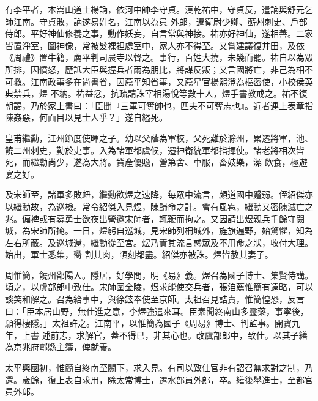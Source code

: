 \begin{pinyinscope}
 有李平者，本嵩山道士楊訥，依河中帥李守貞。漢乾祐中，守貞反，遣訥與舒元乞師江南。守貞敗，訥遂易姓名，江南以為員
 外郎，遷衛尉少卿、蘄州刺史、戶部侍郎。平好神仙修養之事，動作妖妄，自言常與神接。祐亦好神仙，遂相善。二家皆置淨室，圖神像，常被髮裸袒處室中，家人亦不得至。又嘗建議復井田，及依《周禮》置牛籍，薦平判司農寺以督之。事行，百姓大撓，未幾而罷。祐自以為眾所排，因憤怒，歷詆大臣與握兵者兩為朋比，將謀反叛；又言國將亡，非己為相不可救。江南政事多在尚書省，因薦平知省事，又薦星官楊熙澄為樞密使，小校侯英典禁兵，煜
 不納。祐益忿，抗疏請誅宰相湯悅等數十人，煜手書教戒之。祐不復朝謁，乃於家上書曰：「臣聞『三軍可奪帥也，匹夫不可奪志也』。近者連上表章指陳姦惡，何面目以見士人乎？」遂自縊死。



 皇甫繼勳，江州節度使暉之子。幼以父蔭為軍校，父死難於滁州，累遷將軍，池、饒二州刺史，勤於吏事。入為諸軍都虞候，遷神衛統軍都指揮使。諸老將相次皆死，而繼勳尚少，遂為大將。貲產優贍，營第舍、車服，畜妓樂，潔
 飲食，極遊宴之好。



 及宋師至，諸軍多敗衄，繼勳欲煜之速降，每眾中流言，頗道國中蹙弱。侄紹傑亦以繼勳故，為巡檢。常令紹傑入見煜，陳歸命之計。會有風雹，繼勳又密陳滅亡之兆。偏裨或有募勇士欲夜出營邀宋師者，輒鞭而拘之。又因請出煜親兵千餘守闕城，為宋師所掩。一日，煜躬自巡城，見宋師列柵城外，旌旗遍野，始驚懼，知為左右所蔽。及巡城還，繼勳從至宮。煜乃責其流言惑眾及不用命之狀，收付大理。始出，軍士悉集，臠
 割其肉，頃刻都盡。紹傑亦被誅。煜皆赦其妻子。



 周惟簡，饒州鄱陽人。隱居，好學問，明《易》義。煜召為國子博士、集賢侍講。頃之，以虞部郎中致仕。宋師圍金陵，煜求能使交兵者，張洎薦惟簡有遠略，可以談笑和解之。召為給事中，與徐鉉奉使至京師。太祖召見詰責，惟簡惶恐，反言曰：「臣本居山野，無仕進之意，李煜強遣來耳。臣素聞終南山多靈藥，事寧後，願得棲隱。」太祖許之。江南平，以惟簡為國子《周易》博士、判監事。開寶九年，上書
 述前志，求解官，蓋不得已，非其心也。改虞部郎中，致仕。以其子繕為京兆府鄠縣主簿，俾就養。



 太平興國初，惟簡自終南至闕下，求入見。有司以致仕官非有詔召無求對之制，乃還。歲餘，復上表自求用，除太常博士，遷水部員外郎，卒。繕後舉進士，至都官員外郎。



\end{pinyinscope}